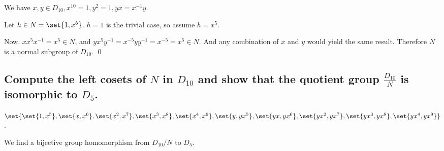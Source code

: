 
        We have $x,y \in D_{10}, x^{10} = 1, y^2 = 1, yx = x^{-1}y$.

        Let $h \in N = \set{1,x^5}$. $h = 1$ is the trivial case, so assume $h = x^5$.

        Now, $x x^5 x^{-1} = x^5 \in N$, and $y x^5 y^{-1} = x^{-5} y y^{-1} = x^{-5} = x^5 \in N$.
        And any combination of $x$ and $y$ would yield the same result.
        Therefore $N$ is a normal subgroup of $D_{10}$.
        \qed
        
        

    \subsection[(iii)]{Compute the left cosets of $N$ in $D_{10}$ and show that the quotient group
        $\frac{D_{10}}{N}$ is isomorphic to $D_5$.}

        \(
            \set{
                \set{1, x^5},
                \set{x, x^6},
                \set{x^2, x^7},
                \set{x^3, x^8},
                \set{x^4, x^9},
                \set{y, yx^5},
                \set{yx, yx^6},
                \set{yx^2, yx^7},
                \set{yx^3, yx^8},
                \set{yx^4, yx^9}
            }
        \).

        We find a bijective group homomorphism from $D_{10}/N$ to $D_5$.

